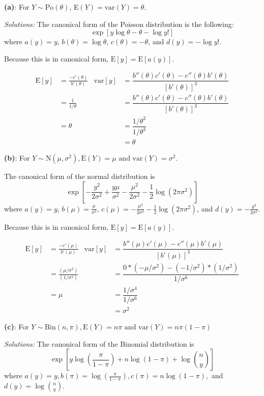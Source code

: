 \documentclass[]{article}
\begin{document}
\textbf{(a)}: For \(Y \sim \text{Po}(\theta)\),
E\((Y) = \text{var}(Y) = \theta\).

\emph{Solutions: } The canonical form of the Poisson distribution is the
following: \[\exp[y\log\theta - \theta - \log y!]\] where \(a(y) = y\),
\(b(\theta) = \log\theta\), \(c(\theta) = -\theta\), and
\(d(y) = -\log y!\).

Because this is in canonical form, \(\text{E}[y] = \text{E}[a(y)]\).

\begin{align*}
\text{E}[y] &= \frac{-c'(\theta)}{b'(\theta)} & \text{var}[y] &= \dfrac{b''(\theta)c'(\theta) - c''(\theta)b'(\theta)}{[b'(\theta)]^3}\\
&= \frac{1}{1/\theta} & &= \dfrac{b''(\theta)c'(\theta) - c''(\theta)b'(\theta)}{[b'(\theta)]^3}\\
&= \theta & &= \dfrac{1/\theta^2}{1/\theta^3}\\
& & &= \theta
\end{align*}

\textbf{(b)}: For
\(Y \sim \text{N}(\mu, \sigma^2), \text{E}(Y) = \mu \text{ and var}(Y) = \sigma^2\).

The canonical form of the normal distribution is \[
\exp\left[-\frac{y^2}{2\sigma^2} + \frac{y\mu}{\sigma^2} - \frac{\mu^2}{2\sigma^2} - \frac{1}{2}\log(2\pi\sigma^2)   \right]
\] where \(a(y) = y\), \(b(\mu) = \frac{\mu}{\sigma^2}\),
\(c(\mu) = -\frac{\mu^2}{2\sigma^2} - \frac{1}{2}\log(2\pi\sigma^2)\),
and \(d(y) = -\frac{y^2}{2\sigma^2}\).

Because this is in canonical form, \(\text{E}[y] = \text{E}[a(y)]\).

\begin{align*}
\text{E}[y] &= \frac{-c'(\mu)}{b'(\mu)} & \text{var}[y] &= \dfrac{b''(\mu)c'(\mu) - c''(\mu)b'(\mu)}{[b'(\mu)]^3}\\
&= \frac{(\mu/\sigma^2)}{(1/\sigma^2)}      & &= \dfrac{0*(-\mu/\sigma^2) - (-1/\sigma^2)*(1/\sigma^2)}{1/\sigma^6} \\
&= \mu                                      & &= \dfrac{1/\sigma^4}{1/\sigma^6}\\
& & &= \sigma^2
\end{align*}

\textbf{(c)}: For
\(Y \sim \text{Bin}(n, \pi), \text{E}(Y) = n\pi \text{ and var}(Y) = n\pi(1 - \pi)\)

\emph{Solutions: } The canonical form of the Binomial distribution is \[
\exp\left[y\log\left(\frac{\pi}{1-\pi}\right) + n\log(1-\pi) + \log\binom{n}{y}\right]
\] where
\(a(y) = y, b(\pi) = \log\left(\frac{\pi}{1-\pi}\right), c(\pi) = n\log(1-\pi),\)
and \(d(y) = \log\binom{n}{y}\).
\end{document}
